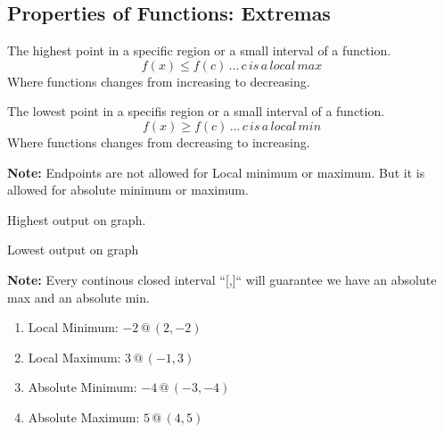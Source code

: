 \subsection{Properties of Functions: Extremas}
\begin{definition}
  The highest point in a specific region or a small interval of a function.
  $$f(x) \le f(c) \, ... \, c \, is \, a \, local \, max$$
  Where functions changes from increasing to decreasing.
\end{definition}

\begin{definition}
  The lowest point in a specifis region or a small interval of a function.
  $$f(x) \ge f(c) \, ... \, c \, is \, a \, local \, min$$
  Where functions changes from decreasing to increasing.
\end{definition}

\textbf{Note: } Endpoints are not allowed for Local minimum or maximum. But it is allowed for absolute minimum or maximum.

\begin{definition}
  Highest output on graph.
\end{definition}

\begin{definition}
  Lowest output on graph
\end{definition}

\textbf{Note: } Every continous closed interval ``[,]`` will guarantee we have an absolute max and an absolute min.

\begin{example}[Graph]
  \hfill
  \begin{center}
  \end{center}
  \begin{enumerate}
  \item Local Minimum: $-2 \, @ \, (2, -2)$
  \item Local Maximum: $3 \, @ \, (-1, 3)$
  \item Absolute Minimum: $-4 \, @ \, (-3, -4)$
  \item Absolute Maximum: $5 \, @ \, (4, 5)$
  \end{enumerate}
\end{example}
